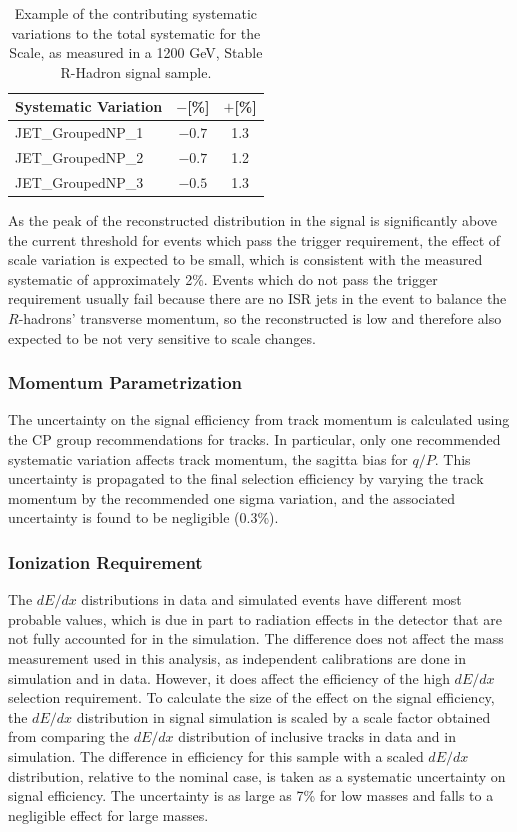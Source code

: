 \begin{table}
  \caption[]{Example of the contributing systematic variations to the total systematic for the \met Scale, as measured in a 1200 GeV, Stable R-Hadron signal sample.
  \label{tab:met_syst_contributions}}
  \begin{center}
  \begin{tabular}{lcc}
  \hline
  Systematic Variation & $-$[\%]& $+$[\%] \\
  \hline
  JET\_GroupedNP\_1 & $-0.7$ & 1.3\\
  JET\_GroupedNP\_2 & $-0.7$ & 1.2\\
  JET\_GroupedNP\_3 & $-0.5$ & 1.3\\
  \hline
  \end{tabular}
  \end{center}
\end{table}

As the peak of the reconstructed \met distribution in the signal is significantly above the current threshold for events which pass the trigger requirement, the effect of scale variation is expected to be small, which is consistent with the measured systematic of approximately 2\%. Events which do not pass the trigger requirement usually fail because there are no ISR jets in the event to balance the $R$-hadrons' transverse momentum, so the reconstructed \met is low and therefore also expected to be not very sensitive to scale changes.

\subsubsection{Momentum Parametrization}
The uncertainty on the signal efficiency from track momentum is calculated using the \ac{CP} group recommendations for tracks. 
In particular, only one recommended systematic variation affects track momentum, the sagitta bias for $q/P$. 
This uncertainty is propagated to the final selection efficiency by varying the track momentum by the recommended one sigma variation, and the associated uncertainty is found to be negligible (0.3\%). 

\subsubsection{Ionization Requirement}
The $dE/dx$ distributions in data and simulated events have different most probable values, which is due in part to radiation effects in the detector that are not fully accounted for in the simulation. 
The difference does not affect the mass measurement used in this analysis, as independent calibrations are done in simulation and in data. 
However, it does affect the efficiency of the high $dE/dx$ selection requirement. 
To calculate the size of the effect on the signal efficiency, the $dE/dx$ distribution in signal simulation is scaled by a scale factor obtained from comparing the $dE/dx$ distribution of inclusive tracks in data and in simulation. 
The difference in efficiency for this sample with a scaled $dE/dx$ distribution, relative to the nominal case, is taken as a systematic uncertainty on signal efficiency.
The uncertainty is as large as 7\% for low masses and falls to a negligible effect for large masses. 

